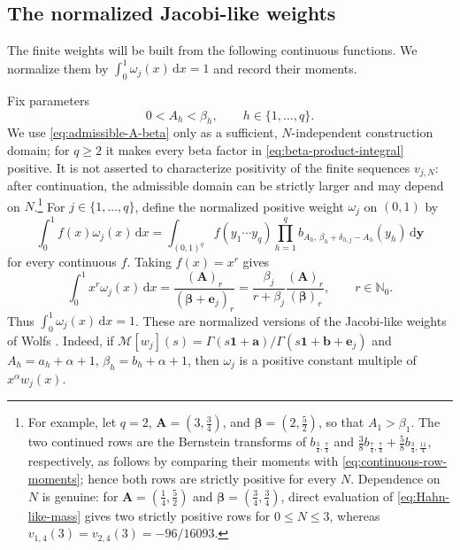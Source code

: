 \documentclass[10pt]{amsart}
\newcommand{\Nzero}{\mathbb N_0}
\newcommand{\dd}{\,\mathrm d}
\newcommand{\one}{\boldsymbol 1}
\newcommand{\A}{\boldsymbol A}
\newcommand{\bbeta}{\boldsymbol\beta}
\newcommand{\ee}{\boldsymbol e}
\theoremstyle{plain}
\theoremstyle{definition}
\theoremstyle{remark}
\begin{document}
\subsection{The normalized Jacobi-like weights}

The finite weights will be built from the following continuous functions.
We normalize them by \(\int_0^1\omega_j(x)\dd x=1\) and record their moments.

Fix parameters
\begin{equation}
 0<A_h<\beta_h,
 \qquad h\in\{1,\ldots,q\}.
 \label{eq:admissible-A-beta}
\end{equation}
We use \eqref{eq:admissible-A-beta} only as a sufficient,
\(N\)-independent construction domain; for \(q\ge2\) it makes every beta
factor in \eqref{eq:beta-product-integral} positive. It is not asserted to
characterize positivity of the finite sequences \(v_{j,N}\): after
continuation, the admissible domain can be strictly larger and may depend
on \(N\).\footnote{For example, let \(q=2\),
\(\A=(3,\frac34)\), and \(\bbeta=(2,\frac52)\), so that
\(A_1>\beta_1\). The two continued rows are the Bernstein transforms of
\(b_{\frac34,\frac74}\) and
\(\frac38b_{\frac74,\frac74}+\frac58b_{\frac34,\frac{11}4}\), respectively,
as follows by comparing their moments with
\eqref{eq:continuous-row-moments}; hence both rows are strictly positive
for every \(N\). Dependence on \(N\) is genuine: for
\(\A=(\frac14,\frac52)\) and \(\bbeta=(\frac34,\frac34)\), direct
evaluation of \eqref{eq:Hahn-like-mass} gives two strictly positive rows
for \(0\le N\le3\), whereas
\(v_{1,4}(3)=v_{2,4}(3)=-96/16093\).}
For \(j\in\{1,\ldots,q\}\), define the normalized positive weight
\(\omega_j\) on \((0,1)\) by
\begin{equation}
 \int_0^1 f(x)\omega_j(x)\dd x
 =\int_{(0,1)^q}f(y_1\cdots y_q)
 \prod_{h=1}^q
 b_{A_h,\,\beta_h+\delta_{h,j}-A_h}(y_h)\dd\boldsymbol y
 \label{eq:beta-product-integral}
\end{equation}
for every continuous \(f\). Taking \(f(x)=x^r\) gives
\begin{equation}
 \int_0^1x^r\omega_j(x)\dd x
 =\frac{(\A)_r}{(\bbeta+\ee_j)_r}
 =\frac{\beta_j}{r+\beta_j}
 \frac{(\A)_r}{(\bbeta)_r},
 \qquad r\in\Nzero.
 \label{eq:continuous-row-moments}
\end{equation}
Thus \(\int_0^1\omega_j(x)\dd x=1\). These are normalized versions of the
Jacobi-like weights of Wolfs
\cite{Wolfs2024}. Indeed, if
\(\mathcal M[w_j](s)=
\Gamma(s\one+\boldsymbol a)/
\Gamma(s\one+\boldsymbol b+\ee_j)\)
and \(A_h=a_h+\alpha+1\), \(\beta_h=b_h+\alpha+1\), then \(\omega_j\) is a
positive constant multiple of \(x^\alpha w_j(x)\).
\end{document}
